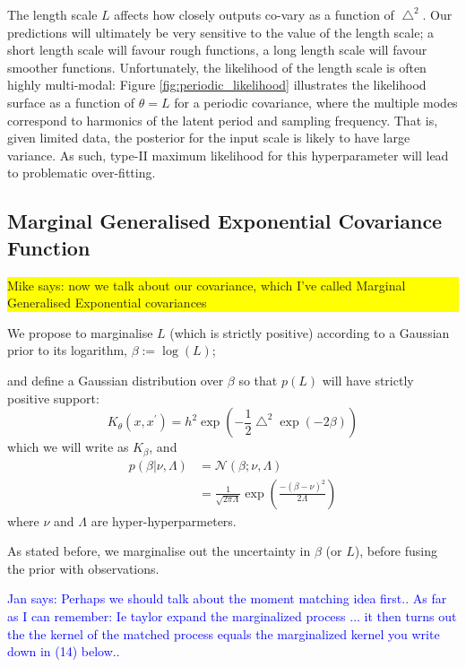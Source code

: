 \documentclass{article}
\newcommand\jansays[1]{\textcolor{blue}{Jan says: #1}}
\newcommand\mikesays[1]{\colorbox{yellow}{\parbox{\columnwidth}{Mike says: #1}}}
\begin{document}
The length scale $L$ affects how closely outputs co-vary as a function of $\bigtriangleup^2$. Our predictions will ultimately be very sensitive to the value of the length scale; a short length scale will favour rough functions, a long length scale will favour smoother functions. Unfortunately, the likelihood of the length scale is often highly multi-modal: Figure \ref{fig:periodic_likelihood} illustrates the likelihood surface as a function of $\theta = L$ for a periodic covariance, where the multiple modes correspond to harmonics of the latent period and sampling frequency. That is, given limited data, the posterior for the input scale is likely to have large variance. As such, type-II maximum likelihood for this hyperparameter will lead to problematic over-fitting. 

\subsection{Marginal Generalised Exponential Covariance Function} \mikesays{now we talk about our covariance, which I've called Marginal Generalised Exponential covariances}




We propose to marginalise $L$ (which is strictly positive) according to a Gaussian prior to its logarithm, $\beta := \log(L)$;
%  


 and define a Gaussian distribution over $\beta$ so that $p(L)$ will have strictly positive support: 
\begin{equation}\label{betaSEkernel}
K_\theta(x,x^\prime) = h^2 \exp \left( -\frac{1}{2}\bigtriangleup^2 \exp(-2\beta) \right)
\end{equation}
which we will write as $K_\beta$, and
\begin{align}
p(\beta|\nu,\Lambda) &= \mathcal{N}(\beta; \nu, \Lambda) \nonumber\\
&= \frac{1}{\sqrt{2 \pi \Lambda}} \exp \left( \frac{ -(\beta - \nu)^2}{2\Lambda} \right) \label{betapdf}
\end{align}
where $\nu$ and $\Lambda$ are hyper-hyperparmeters.

As stated before, we marginalise out the uncertainty in $\beta$ (or $L$), before fusing the prior with observations. 

\jansays{Perhaps we should talk about the moment matching idea first.. As far as I can remember: Ie taylor expand the marginalized process ... it then turns out the the kernel of the matched process equals the marginalized kernel you write down in (14) below..}
\end{document}
